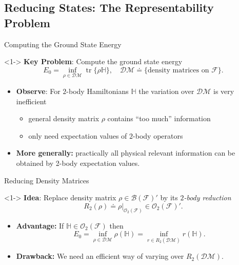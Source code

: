 \documentclass{beamer}
\DeclareMathOperator{\tr}{tr}
\newcommand{\FockSpace}{\mathcal{F}}
\newcommand{\Hamiltonian}{\mathbb{H}}
\newcommand{\DensityMatrices}{\mathcal{DM}}
\newcommand{\kbOp}[1][k]{{\ensuremath{\mathcal{O}_{#1}(\mathcal{F})}}}
\begin{document}
\subsection{Reducing States: The Representability Problem}
\begin{frame}{Computing the Ground State Energy}
    \begin{block}{}<1->
        \textbf{Key Problem}: Compute the ground state energy
        \begin{equation}
            \label{GSE}
            E_0=\inf_{\rho\in\DensityMatrices}\tr\{\rho\Hamiltonian\},
            \quad\DensityMatrices\doteq\{\text{density matrices on }\FockSpace\}.
        \end{equation}
    \end{block}
    \begin{itemize}
        \item<2-> \textbf{Observe}: For $2$-body Hamiltonians $\Hamiltonian$ the variation over
        $\DensityMatrices$ is very inefficient
        \begin{itemize}
            \item<3-> general density matrix $\rho$ contains ``too much'' information
            \item<3-> only need expectation values of $2$-body operators
        \end{itemize}
        \item<4-> \textbf{More generally:} practically all physical relevant information can be obtained by
        2-body expectation values.
    \end{itemize}
\end{frame}

\begin{frame}{Reducing Density Matrices}
    \begin{block}{}<1->
        \textbf{Idea}: Replace density matrix $\rho\in\mathcal{B}(\FockSpace)'$ by its
        \emph{$2$-body reduction}
        \begin{equation}
            R_2(\rho)\doteq\rho|_{\kbOp[2]}\in\kbOp[2]'.
        \end{equation}
    \end{block}
    \begin{itemize}
        \item<2-> \textbf{Advantage:} If $\Hamiltonian\in\kbOp[2]$ then
        \begin{equation}
            E_0=\inf_{\rho\in\DensityMatrices}\rho(\Hamiltonian)=
            \inf_{r\in R_2(\DensityMatrices)}r(\Hamiltonian).
        \end{equation}
        \item<3-> \textbf{Drawback:} We need an efficient way of varying over $R_2(\DensityMatrices)$.
    \end{itemize}
\end{frame}
\end{document}
